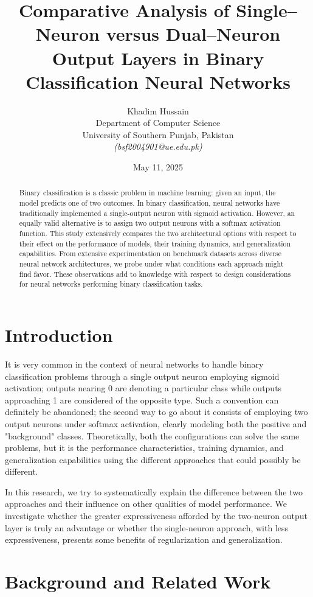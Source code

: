 \documentclass[11pt]{article}
\title{Comparative Analysis of Single--Neuron versus Dual--Neuron Output Layers in Binary Classification Neural Networks}
\author{Khadim Hussain\\Department of Computer Science \\ University of Southern Punjab, Pakistan\\[1ex]\textit{(bsf2004901@ue.edu.pk)}}
\date{May 11, 2025}
\begin{document}
\maketitle

\begin{abstract}
Binary classification is a classic problem in machine learning: given an input, the model predicts one of two outcomes. In binary classification, neural networks have traditionally implemented a single-output neuron with sigmoid activation. However, an equally valid alternative is to assign two output neurons with a softmax activation function. This study extensively compares the two architectural options with respect to their effect on the performance of models, their training dynamics, and generalization capabilities. From extensive experimentation on benchmark datasets across diverse neural network architectures, we probe under what conditions each approach might find favor. These observations add to knowledge with respect to design considerations for neural networks performing binary classification tasks.
\end{abstract}

\section{Introduction}
It is very common in the context of neural networks to handle binary classification problems through a single output neuron employing sigmoid activation; outputs nearing 0 are denoting a particular class while outputs approaching 1 are considered of the opposite type. Such a convention can definitely be abandoned; the second way to go about it consists of employing two output neurons under softmax activation, clearly modeling both the positive and "background" classes. Theoretically, both the configurations can solve the same problems, but it is the performance characteristics, training dynamics, and generalization capabilities using the different approaches that could possibly be different.

In this research, we try to systematically explain the difference between the two approaches and their influence on other qualities of model performance. We investigate whether the greater expressiveness afforded by the two-neuron output layer is truly an advantage or whether the single-neuron approach, with less expressiveness, presents some benefits of regularization and generalization.

\section{Background and Related Work}
\end{document}

